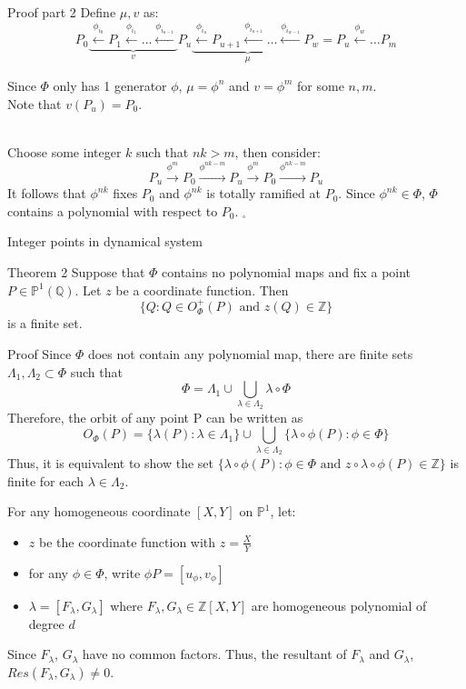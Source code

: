 \documentclass[aspectratio=169,xcolor=dvipsnames]{beamer}
\begin{document}
\begin{frame}{Proof part 2}
    Define $\mu, v$ as:
    $$ P_0\underbrace{\xleftarrow{\phi_{i_0}}P_1\xleftarrow{\phi_{i_1}}\dots \xleftarrow{\phi_{i_{u-1}}}}_v P_{u}\underbrace{\xleftarrow{\phi_{i_u}} P_{u+1}\xleftarrow{\phi_{i_{u+1}}} \dots \xleftarrow{\phi_{i_{w-1}}}}_\mu P_{w} = P_{u}\xleftarrow{\phi_{w}}\dots P_m$$ \pause
    
    Since $\Phi$ only has 1 generator $\phi$, $\mu = \phi^n$ and $v=\phi^m$ for some $n,m$.\\
    Note that $v(P_u)=P_0$. \pause \\~
    
    Choose some integer $k$ such that $nk>m$, then consider:
    $$P_u\xrightarrow{\phi^m}P_0\xrightarrow{\phi^{nk-m}}P_u\xrightarrow{\phi^m}P_0\xrightarrow{\phi^{nk-m}}P_u$$
    It follows that $\phi^{nk}$ fixes $P_0$ and $\phi^{nk}$ is totally ramified at $P_0$. Since $\phi^{nk}\in \Phi$, $\Phi$ contains a polynomial with respect to $P_0$. $_\square$
\end{frame}
\begin{frame}{Integer points in dynamical system}
    \begin{block}{Theorem 2}
        Suppose that $\Phi$ contains no polynomial maps and fix a point $P\in \mathbb{P}^1(\mathbb{Q})$. Let $z$ be a coordinate function. Then $$\{Q: Q \in O^+_\Phi(P) \text{ and } z(Q)\in \mathbb{Z} \}$$ is a finite set.
    \end{block}
\end{frame}
\begin{frame}{Proof}
    Since $\Phi$ does not contain any polynomial map, there are finite sets $\Lambda_1, \Lambda_2 \subset \Phi$ such that 
    $$\Phi = \Lambda_1 \cup \bigcup_{\lambda\in\Lambda_2} \lambda\circ\Phi$$ \pause
    Therefore, the orbit of any point P can be written as
    $$O_\Phi(P) = \{\lambda (P): \lambda\in\Lambda_1\} \cup \bigcup_{\lambda \in \Lambda_2}\{\lambda\circ\phi (P): \phi \in \Phi\}$$ \pause
    Thus, it is equivalent to show the set $\{\lambda\circ\phi (P): \phi \in \Phi\text{ and } z\circ\lambda\circ\phi (P) \in \mathbb{Z} \}$ is finite for each $\lambda \in \Lambda_2$.
    
\end{frame}

\begin{frame}
    For any homogeneous coordinate $[X,Y]$ on $\mathbb{P}^1$, let:\\
    \begin{itemize}
        \item $z$ be the coordinate function with $z = \frac{X}{Y}$
        \item for any $\phi\in \Phi$, write $\phi P = [u_\phi,v_\phi]$
        \item $\lambda = [F_\lambda, G_\lambda]$ where $F_\lambda, G_\lambda \in \mathbb{Z}[X,Y]$ are homogeneous polynomial of degree $d$
    \end{itemize}
    
    Since $F_\lambda$, $G_\lambda$ have no common factors. Thus, the resultant of $F_\lambda$ and $G_\lambda$, $Res(F_\lambda,G_\lambda)\neq 0$.
\end{frame}
\end{document}
